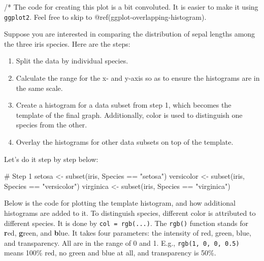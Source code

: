 \documentclass[
  letterpaper,
]{book}
\newenvironment{Shaded}{\begin{snugshade}}{\end{snugshade}}
\newcommand{\CommentTok}[1]{\textcolor[rgb]{0.37,0.37,0.37}{#1}}
\newcommand{\DecValTok}[1]{\textcolor[rgb]{0.68,0.00,0.00}{#1}}
\newcommand{\FunctionTok}[1]{\textcolor[rgb]{0.28,0.35,0.67}{#1}}
\newcommand{\NormalTok}[1]{\textcolor[rgb]{0.00,0.23,0.31}{#1}}
\newcommand{\OtherTok}[1]{\textcolor[rgb]{0.00,0.23,0.31}{#1}}
\newcommand{\SpecialCharTok}[1]{\textcolor[rgb]{0.37,0.37,0.37}{#1}}
\newcommand{\StringTok}[1]{\textcolor[rgb]{0.13,0.47,0.30}{#1}}
\begin{document}
/* The code for creating this plot is a bit convoluted. It is easier to
make it using \texttt{ggplot2}. Feel free to skip to
@ref(ggplot-overlapping-histogram).

Suppose you are interested in comparing the distribution of sepal
lengths among the three iris species. Here are the steps:

\begin{enumerate}
\def\labelenumi{\arabic{enumi}.}
\item
  Split the data by individual species.
\item
  Calculate the range for the x- and y-axis so as to ensure the
  histograms are in the same scale.
\item
  Create a histogram for a data subset from step 1, which becomes the
  template of the final graph. Additionally, color is used to
  distinguish one species from the other.
\item
  Overlay the histograms for other data subsets on top of the template.
\end{enumerate}

Let's do it step by step below:

\begin{Shaded}
\begin{Highlighting}[]
\CommentTok{\# Step 1}
\NormalTok{setosa }\OtherTok{\textless{}{-}} \FunctionTok{subset}\NormalTok{(iris, Species }\SpecialCharTok{==} \StringTok{"setosa"}\NormalTok{)}
\NormalTok{versicolor }\OtherTok{\textless{}{-}} \FunctionTok{subset}\NormalTok{(iris, Species }\SpecialCharTok{==} \StringTok{"versicolor"}\NormalTok{)}
\NormalTok{virginica }\OtherTok{\textless{}{-}} \FunctionTok{subset}\NormalTok{(iris, Species }\SpecialCharTok{==} \StringTok{"virginica"}\NormalTok{)}
\end{Highlighting}
\end{Shaded}

\begin{Shaded}
\end{Shaded}

Below is the code for plotting the template histogram, and how
additional histograms are added to it. To distinguish species, different
color is attributed to different species. It is done by
\texttt{col\ =\ rgb(...)}. The \texttt{rgb()} function stands for
\textbf{r}ed, \textbf{g}reen, and \textbf{b}lue. It takes four
parameters: the intensity of red, green, blue, and transparency. All are
in the range of 0 and 1. E.g., \texttt{rgb(1,\ 0,\ 0,\ 0.5)} means 100\%
red, no green and blue at all, and transparency is 50\%.
\end{document}
